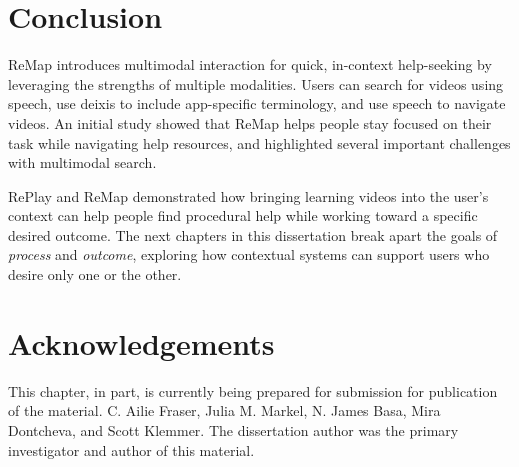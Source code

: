 \section{Conclusion}
ReMap introduces multimodal interaction for quick, in-context help-seeking by leveraging the strengths of multiple modalities. Users can search for videos using speech, use deixis to include app-specific terminology, and use speech to navigate videos. An initial study showed that ReMap helps people stay focused on their task while navigating help resources, and highlighted several important challenges with multimodal search. 

RePlay and ReMap demonstrated how bringing learning videos into the user's context can help people find procedural help while working toward a specific desired outcome. The next chapters in this dissertation break apart the goals of \textit{process} and \textit{outcome}, exploring how contextual systems can support users who desire only one or the other.

\section{Acknowledgements}
This chapter, in part, is currently being prepared for submission for publication of the material. C. Ailie Fraser, Julia M. Markel, N. James Basa, Mira Dontcheva, and Scott Klemmer. The dissertation author was the primary investigator and author of this material.
